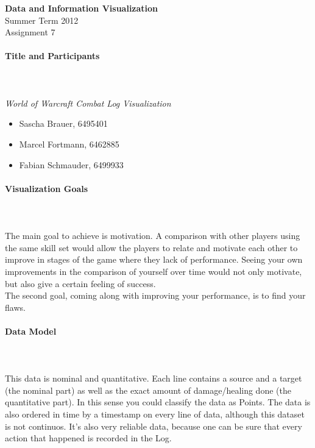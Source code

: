 \documentclass{scrartcl}
\begin{document}
\begin{center}
{\huge \textbf{Data and Information Visualization}}\\
Summer Term 2012\\
Assignment 7
\end{center}

\paragraph{Title and Participants}
\hfill \\ \hfill \\
\emph{World of Warcraft Combat Log Visualization}\\
\begin{itemize}
\item Sascha Brauer, 6495401
\item Marcel Fortmann, 6462885
\item Fabian Schmauder, 6499933
\end{itemize}

\paragraph{Visualization Goals}
\hfill \\ \hfill \\
The main goal to achieve is motivation. A comparison with other players using the same skill set would allow the players to relate and motivate each other to improve in stages of the game where they lack of performance. Seeing your own improvements in the comparison of yourself over time would not only motivate, but also give a certain feeling of success.\\
The second goal, coming along with improving your performance, is to find your flaws.

\paragraph{Data Model}
\hfill \\ \hfill \\
This data is nominal and quantitative. Each line contains a source and a target (the nominal part) as well as the exact amount of damage/healing done (the quantitative part). In this sense you could classify the data as Points. The data is also ordered in time by a timestamp on every line of data, although this dataset is not continuos. It's also very reliable data, because one can be sure that every action that happened is recorded in the Log. 
\end{document}
